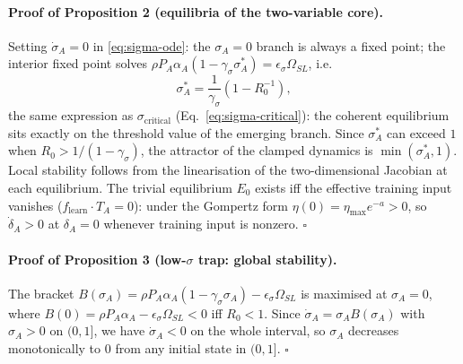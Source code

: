 \documentclass{article}
\theoremstyle{definition}
\begin{document}
\paragraph*{Proof of Proposition 2 (equilibria of the two-variable
core).}
Setting $\dot{\sigma}_A = 0$ in \eqref{eq:sigma-ode}: the
$\sigma_A = 0$ branch is always a fixed point; the interior fixed point
solves $\rho P_A \alpha_A (1 - \gamma_\sigma \sigma_A^*) =
\epsilon_\sigma \Omega_{SL}$, i.e.
\begin{equation}\label{eq:sigma-equilibrium}
\sigma_A^* = \frac{1}{\gamma_\sigma}\left(1 - R_0^{-1}\right),
\end{equation}
the same expression as $\sigma_{\text{critical}}$
(Eq.~\eqref{eq:sigma-critical}): the coherent equilibrium sits exactly
on the threshold value of the emerging branch. Since $\sigma_A^*$ can
exceed $1$ when $R_0 > 1/(1-\gamma_\sigma)$, the attractor of the
clamped dynamics is $\min(\sigma_A^*, 1)$. Local stability follows from
the linearisation of the two-dimensional Jacobian at each equilibrium.
The trivial equilibrium $E_0$ exists iff the effective training input
vanishes ($f_{\text{learn}} \cdot T_A = 0$): under the Gompertz form
$\eta(0) = \eta_{\max} e^{-a} > 0$, so $\dot{\delta}_A > 0$ at
$\delta_A = 0$ whenever training input is nonzero. $\square$

\paragraph*{Proof of Proposition 3 (low-$\sigma$ trap: global
stability).}
The bracket $B(\sigma_A) = \rho P_A \alpha_A (1 - \gamma_\sigma
\sigma_A) - \epsilon_\sigma \Omega_{SL}$ is maximised at
$\sigma_A = 0$, where $B(0) = \rho P_A \alpha_A - \epsilon_\sigma
\Omega_{SL} < 0$ iff $R_0 < 1$. Since $\dot{\sigma}_A = \sigma_A
B(\sigma_A)$ with $\sigma_A > 0$ on $(0,1]$, we have
$\dot{\sigma}_A < 0$ on the whole interval, so $\sigma_A$ decreases
monotonically to $0$ from any initial state in $(0,1]$. $\square$
\end{document}
